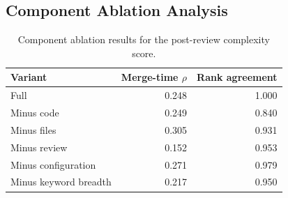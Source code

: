 \subsection{Component Ablation Analysis}

\begin{table}[!h]
\caption{Component ablation results for the post-review complexity score.}\label{tab:ablation}
\centering\small
\begin{tabular}{lrr}
\toprule
Variant & Merge-time $\rho$ & Rank agreement \\
\midrule
Full & 0.248 & 1.000 \\
Minus code & 0.249 & 0.840 \\
Minus files & 0.305 & 0.931 \\
Minus review & 0.152 & 0.953 \\
Minus configuration & 0.271 & 0.979 \\
Minus keyword breadth & 0.217 & 0.950 \\
\bottomrule
\end{tabular}
\end{table}
